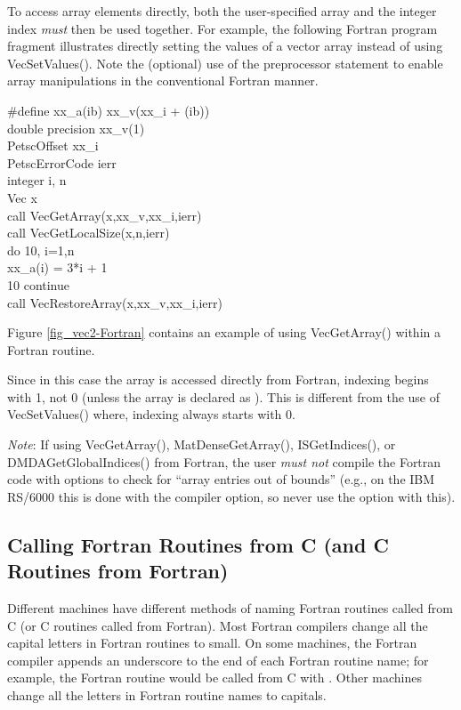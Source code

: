 To access array elements directly, both the user-specified array and
the integer index {\em must} then be used together.
For example, the following Fortran program fragment illustrates
directly setting the values of a vector array instead of using VecSetValues().  Note the (optional) use of the preprocessor
 statement to enable array manipulations in the conventional
Fortran manner.
\begin{tabbing}
   \#define xx\_a(ib)  xx\_v(xx\_i + (ib))\\

    double precision xx\_v(1)\\
    PetscOffset      xx\_i\\
    PetscErrorCode ierr\\
    integer          i, n\\
    Vec              x\\
    call VecGetArray(x,xx\_v,xx\_i,ierr)\\
    call VecGetLocalSize(x,n,ierr)\\
    do 10, i=1,n\\
       xx\_a(i) = 3*i + 1\\
 10 continue\\
    call VecRestoreArray(x,xx\_v,xx\_i,ierr)
\end{tabbing}
Figure \ref{fig_vec2-Fortran} contains an example of using VecGetArray()
within a Fortran routine.

Since in this case the array is accessed directly from Fortran,
indexing begins with 1, not 0 (unless the array is declared as ).
This is different from the use of VecSetValues()
where, indexing always starts with 0.

{\em Note}: If using VecGetArray(), MatDenseGetArray(), ISGetIndices(),
or DMDAGetGlobalIndices()
from Fortran, the user {\em must not} compile the Fortran code with options
to check for ``array entries out of bounds'' (e.g., on the IBM RS/6000 this
is done with the  compiler option, so never use the  option with this).

\subsection{Calling Fortran Routines from C (and C Routines from Fortran)}


Different machines have
different methods of naming Fortran routines called from C
(or C routines called from Fortran). Most Fortran compilers change
all the capital letters in Fortran routines to small. On some machines, the
Fortran compiler appends an underscore to the end of each Fortran
routine name; for example, the Fortran routine 
would be called from C with .  Other machines
change all the letters in Fortran routine names to capitals.

